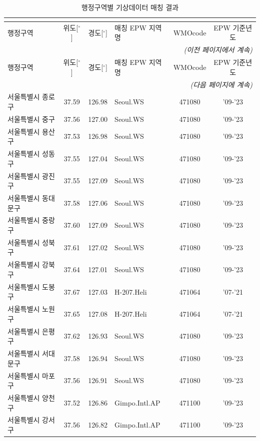 \renewcommand{\arraystretch}{0.8}
\begin{longtable}{lcclcc}
  \caption{행정구역별 기상데이터 매칭 결과} \\
  \label{tab:weather_mapping} \\
  \toprule
  \small
  행정구역 & 위도[$^\circ$] & 경도[$^\circ$] & 매칭 EPW 지역명 & WMOcode & EPW 기준년도 \\ \midrule
  \endfirsthead
  \multicolumn{6}{r}{\textit{(이전 페이지에서 계속)}} \\ \toprule
  행정구역 & 위도[$^\circ$] & 경도[$^\circ$] & 매칭 EPW 지역명 & WMOcode & EPW 기준년도 \\ \midrule
  \endhead
  \midrule \multicolumn{6}{r}{\textit{(다음 페이지에 계속)}} \\ \bottomrule
  \endfoot
  \bottomrule
  \endlastfoot
  서울특별시 종로구 & 37.59 & 126.98 & Seoul.WS & 471080 & '09-'23 \\
  서울특별시 중구 & 37.56 & 127.00 & Seoul.WS & 471080 & '09-'23 \\
  서울특별시 용산구 & 37.53 & 126.98 & Seoul.WS & 471080 & '09-'23 \\
  서울특별시 성동구 & 37.55 & 127.04 & Seoul.WS & 471080 & '09-'23 \\
  서울특별시 광진구 & 37.55 & 127.09 & Seoul.WS & 471080 & '09-'23 \\
  서울특별시 동대문구 & 37.58 & 127.06 & Seoul.WS & 471080 & '09-'23 \\
  서울특별시 중랑구 & 37.60 & 127.09 & Seoul.WS & 471080 & '09-'23 \\
  서울특별시 성북구 & 37.61 & 127.02 & Seoul.WS & 471080 & '09-'23 \\
  서울특별시 강북구 & 37.64 & 127.01 & Seoul.WS & 471080 & '09-'23 \\
  서울특별시 도봉구 & 37.67 & 127.03 & H-207.Heli & 471064 & '07-'21 \\
  서울특별시 노원구 & 37.65 & 127.08 & H-207.Heli & 471064 & '07-'21 \\
  서울특별시 은평구 & 37.62 & 126.93 & Seoul.WS & 471080 & '09-'23 \\
  서울특별시 서대문구 & 37.58 & 126.94 & Seoul.WS & 471080 & '09-'23 \\
  서울특별시 마포구 & 37.56 & 126.91 & Seoul.WS & 471080 & '09-'23 \\
  서울특별시 양천구 & 37.52 & 126.86 & Gimpo.Intl.AP & 471100 & '09-'23 \\
  서울특별시 강서구 & 37.56 & 126.82 & Gimpo.Intl.AP & 471100 & '09-'23 \\

\end{longtable}
